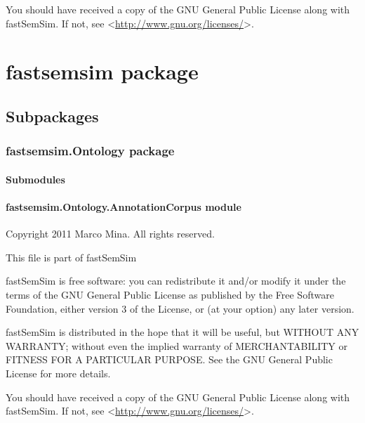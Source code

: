 \documentclass[letterpaper,10pt,english]{sphinxmanual}
\begin{document}
You should have received a copy of the GNU General Public License
along with fastSemSim.  If not, see \textless{}\href{http://www.gnu.org/licenses/}{http://www.gnu.org/licenses/}\textgreater{}.


\chapter{fastsemsim package}
\label{fastsemsim::doc}\label{fastsemsim:fastsemsim-package}

\section{Subpackages}
\label{fastsemsim:subpackages}

\subsection{fastsemsim.Ontology package}
\label{fastsemsim.Ontology:fastsemsim-ontology-package}\label{fastsemsim.Ontology::doc}

\subsubsection{Submodules}
\label{fastsemsim.Ontology:submodules}

\subsubsection{fastsemsim.Ontology.AnnotationCorpus module}
\label{fastsemsim.Ontology:module-fastsemsim.Ontology.AnnotationCorpus}\label{fastsemsim.Ontology:fastsemsim-ontology-annotationcorpus-module}
Copyright 2011 Marco Mina. All rights reserved.

This file is part of fastSemSim

fastSemSim is free software: you can redistribute it and/or modify
it under the terms of the GNU General Public License as published by
the Free Software Foundation, either version 3 of the License, or
(at your option) any later version.

fastSemSim is distributed in the hope that it will be useful,
but WITHOUT ANY WARRANTY; without even the implied warranty of
MERCHANTABILITY or FITNESS FOR A PARTICULAR PURPOSE.  See the
GNU General Public License for more details.

You should have received a copy of the GNU General Public License
along with fastSemSim.  If not, see \textless{}\href{http://www.gnu.org/licenses/}{http://www.gnu.org/licenses/}\textgreater{}.
\end{document}
